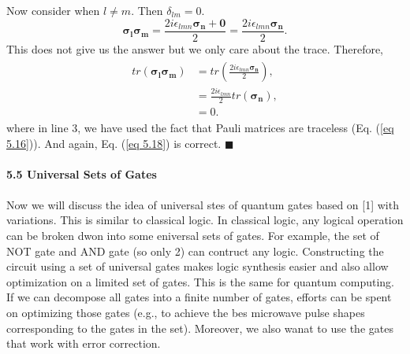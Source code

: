 \documentclass{article}
\begin{document}
Now consider when $l\neq m$. Then $\delta_{lm}=0$.
\begin{equation}\label{eq 5.21}
    \boldsymbol{\sigma_l\sigma_m}=\frac{2i\epsilon_{lmn}\boldsymbol{\sigma_n}+\boldsymbol{0}}{2}=\frac{2i\epsilon_{lmn}\boldsymbol{\sigma_n}}{2}.\tag{5.21}
\end{equation}
This does not give us the answer but we only care about the trace. Therefore,
\begin{align}\label{eq 5.22}
    \begin{split}
        tr(\boldsymbol{\sigma_l\sigma_m})&=tr(\frac{2i\epsilon_{lmn}\boldsymbol{\sigma_n}}{2}),\\
        &=\frac{2i\epsilon_{lmn}}{2}tr(\boldsymbol{\sigma_n}),\\
        &=0.
    \end{split} \tag{5.22}
\end{align}
where in line 3, we have used the fact that Pauli matrices are traceless (Eq. (\ref{eq 5.16})). 
And again, Eq. (\ref{eq 5.18}) is correct. \hfill $\blacksquare$
\\\\
\textbf{\large 5.5 Universal Sets of Gates}\\\\
Now we will discuss the idea of universal stes of quantum gates based on [1] with
variations. This is similar to classical logic. In classical logic, any logical operation can be 
broken dwon into some eniversal sets of gates. For example, the set of NOT gate and AND gate
(so only 2) can contruct any logic. Constructing the circuit using a set of universal gates makes logic synthesis
easier and also allow optimization on a limited set of gates. This is the same for quantum computing.
If we can decompose all gates into a finite number of gates, efforts can be spent on optimizing those gates 
(e.g., to achieve the bes microwave pulse shapes corresponding to the gates
in the set). Moreover, we also wanat to use the gates that work with error correction.
\end{document}
